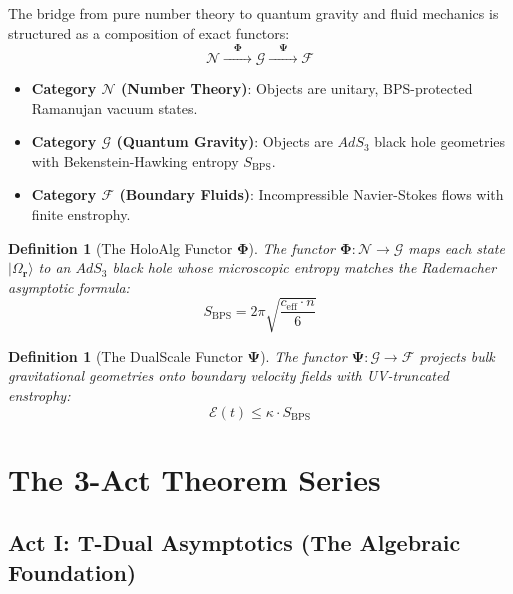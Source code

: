 \documentclass[11pt,twoside,openright]{book}
\newtheorem{definition}[theorem]{Definition}
\begin{document}
The bridge from pure number theory to quantum gravity and fluid mechanics is structured as a composition of exact functors:
\begin{equation}
\mathcal{N} \xrightarrow{\quad\boldsymbol{\Phi}\quad} \mathcal{G} \xrightarrow{\quad\boldsymbol{\Psi}\quad} \mathcal{F}
\end{equation}

\begin{itemize}
    \item \textbf{Category $\mathcal{N}$ (Number Theory)}: Objects are unitary, BPS-protected Ramanujan vacuum states.
    \item \textbf{Category $\mathcal{G}$ (Quantum Gravity)}: Objects are $AdS_3$ black hole geometries with Bekenstein-Hawking entropy $S_{\text{BPS}}$.
    \item \textbf{Category $\mathcal{F}$ (Boundary Fluids)}: Incompressible Navier-Stokes flows with finite enstrophy.
\end{itemize}

\begin{definition}[The HoloAlg Functor $\boldsymbol{\Phi}$]
The functor $\boldsymbol{\Phi} : \mathcal{N} \to \mathcal{G}$ maps each state $|\Omega_{\mathbf{r}}\rangle$ to an $AdS_3$ black hole whose microscopic entropy matches the Rademacher asymptotic formula:
\begin{equation}
S_{\text{BPS}} = 2\pi \sqrt{\frac{c_{\text{eff}} \cdot n}{6}}
\end{equation}
\end{definition}

\begin{definition}[The DualScale Functor $\boldsymbol{\Psi}$]
The functor $\boldsymbol{\Psi} : \mathcal{G} \to \mathcal{F}$ projects bulk gravitational geometries onto boundary velocity fields with UV-truncated enstrophy:
\begin{equation}
\mathcal{E}(t) \le \kappa \cdot S_{\text{BPS}}
\end{equation}
\end{definition}

\part{The 3-Act Theorem Series}

\chapter{Act I: T-Dual Asymptotics (The Algebraic Foundation)}
\end{document}

